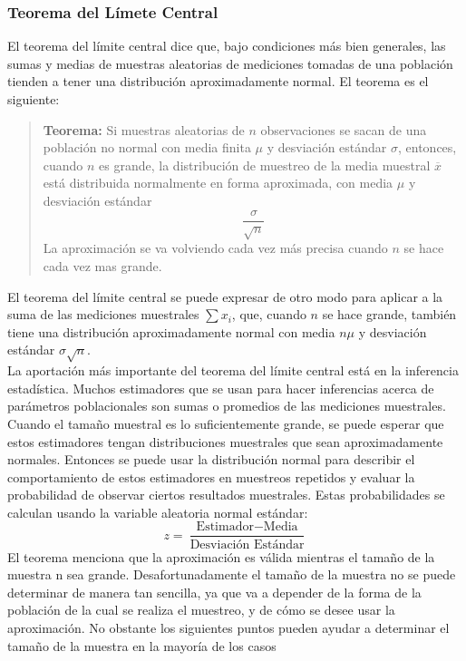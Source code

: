 \documentclass[]{article}
\begin{document}
\subsubsection*{Teorema del Límete Central}
El teorema del límite central dice que, bajo condiciones más bien generales, las sumas y medias de muestras aleatorias de mediciones tomadas de una población tienden a tener una distribución aproximadamente normal. El teorema es el siguiente:
\begin{quote}
	\textbf{Teorema:} Si muestras aleatorias de $n$ observaciones se sacan de una población no normal con media finita $\mu$ y desviación estándar $\sigma$, entonces, cuando $n$ es grande, la distribución de muestreo de la media muestral $\overline{x}$ está distribuida normalmente en forma aproximada, con media $\mu$ y desviación estándar
	\[
	\frac{\sigma}{\sqrt{n}}
	\]
	La aproximación se va volviendo cada vez más precisa cuando $n$ se hace cada vez mas grande.
\end{quote}
El teorema del límite central se puede expresar de otro modo para aplicar a la suma de las mediciones muestrales $\sum{x_i}$, que, cuando $n$ se hace grande, también tiene una distribución aproximadamente normal con media $n\mu$ y desviación estándar $\sigma\sqrt{n}$.
\\ La aportación más importante del teorema del límite central está en la inferencia estadística. Muchos estimadores que se usan para hacer inferencias acerca de parámetros poblacionales son sumas o promedios de las mediciones muestrales. Cuando el tamaño muestral es lo suficientemente grande, se puede esperar que estos estimadores tengan distribuciones muestrales que sean aproximadamente normales. Entonces se puede usar la distribución normal para describir el comportamiento de estos estimadores en muestreos repetidos y evaluar la probabilidad de observar ciertos resultados muestrales. Estas probabilidades se calculan usando la variable aleatoria normal estándar:
\[
z = \frac{\text{Estimador} - \text{Media}}{\text{Desviación Estándar}}
\]
El teorema menciona que la aproximación es válida mientras el tamaño de la muestra n sea grande. Desafortunadamente el tamaño de la muestra no se puede determinar de manera tan sencilla, ya que va a depender de la forma de la población de la cual se realiza el muestreo, y de cómo se desee usar la aproximación. No obstante los siguientes puntos pueden ayudar a determinar el tamaño de la muestra en la mayoría de los casos
\end{document}
